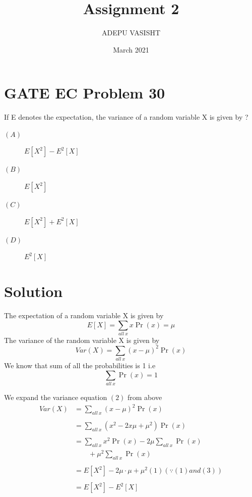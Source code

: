 \documentclass[journal,12pt,twocolumn]{IEEEtran}
\title{Assignment 2}
\author{ADEPU VASISHT}
\date{March 2021}
\providecommand{\brak}[1]{\ensuremath{\left(#1\right)}}
\begin{document}
\maketitle

\section*{GATE EC Problem 30}
If E denotes the expectation, the variance of a random variable X is given by ?

\begin{description}
\item[$\brak{A}$]$E[X^2]-E^2[X]$ 
\item[$\brak{B}$]$E[X^2]$
\item[$\brak{C}$]$E[X^2]+E^2[X]$ 
\item[$\brak{D}$]$E^2[X]$
\end{description}

\section*{Solution}
The expectation of a random variable X is given by
\begin{equation}
E[X]=\sum_{all \ x}x\Pr\brak{x}=\mu
\end{equation} 
The variance of the random variable X is given by
\begin{equation}
Var\brak{X}=\sum_{all \ x}\brak{x-\mu}^2\Pr\brak{x}
\end{equation} 
We know that sum of all the probabilities is 1 i.e
\begin{equation}
\sum_{all \ x}\Pr\brak{x} = 1
\end{equation}

We expand the variance equation $\brak{2}$ from above
\begin{align}
\nonumber Var\brak{X}&=\sum_{all \ x}\brak{x-\mu}^2\Pr\brak{x}\\\nonumber\\\nonumber
&= \sum_{all \ x}\brak{x^2-2x\mu+\mu^2}\Pr\brak{x}\\\nonumber\\\nonumber
&= \sum_{all \ x}x^2\Pr\brak{x}-2\mu\sum_{all \ x}\Pr\brak{x}\\\nonumber
&\qquad  +\mu^2\sum_{all \ x}\Pr\brak{x}\\\nonumber\\\nonumber
&= E[X^2]-2\mu\cdot\mu+ \mu^2\brak{1} \brak{\because \brak{1} and \brak{3}}\\\nonumber\\\nonumber
&= E[X^2]-E^2[X]
\end{align}
\end{document}
